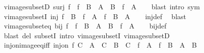 \begin{isabellebody}
{\isafoldproof}%
%
\isadelimproof
\isanewline
%
\endisadelimproof
\isanewline
{}\isamarkupfalse%
\ vimage{\isacharunderscore}{\kern0pt}subsetD{\isacharcolon}{\kern0pt}\ {\isachardoublequoteopen}surj\ f\ {\isasymLongrightarrow}\ f\ {\isacharminus}{\kern0pt}{\isacharbackquote}{\kern0pt}\ B\ {\isasymsubseteq}\ A\ {\isasymLongrightarrow}\ B\ {\isasymsubseteq}\ f\ {\isacharbackquote}{\kern0pt}\ A{\isachardoublequoteclose}\isanewline
%
\isadelimproof
\ \ %
\endisadelimproof
%
\isatagproof
{}\isamarkupfalse%
\ {\isacharparenleft}{\kern0pt}blast\ intro{\isacharcolon}{\kern0pt}\ sym{\isacharparenright}{\kern0pt}%
\endisatagproof
{\isafoldproof}%
%
\isadelimproof
\isanewline
%
\endisadelimproof
\isanewline
{}\isamarkupfalse%
\ vimage{\isacharunderscore}{\kern0pt}subsetI{\isacharcolon}{\kern0pt}\ {\isachardoublequoteopen}inj\ f\ {\isasymLongrightarrow}\ B\ {\isasymsubseteq}\ f\ {\isacharbackquote}{\kern0pt}\ A\ {\isasymLongrightarrow}\ f\ {\isacharminus}{\kern0pt}{\isacharbackquote}{\kern0pt}\ B\ {\isasymsubseteq}\ A{\isachardoublequoteclose}\isanewline
%
\isadelimproof
\ \ %
\endisadelimproof
%
\isatagproof
{}\isamarkupfalse%
\ inj{\isacharunderscore}{\kern0pt}def\ \isamarkupfalse%
\ blast%
\endisatagproof
{\isafoldproof}%
%
\isadelimproof
\isanewline
%
\endisadelimproof
\isanewline
{}\isamarkupfalse%
\ vimage{\isacharunderscore}{\kern0pt}subset{\isacharunderscore}{\kern0pt}eq{\isacharcolon}{\kern0pt}\ {\isachardoublequoteopen}bij\ f\ {\isasymLongrightarrow}\ f\ {\isacharminus}{\kern0pt}{\isacharbackquote}{\kern0pt}\ B\ {\isasymsubseteq}\ A\ {\isasymlongleftrightarrow}\ B\ {\isasymsubseteq}\ f\ {\isacharbackquote}{\kern0pt}\ A{\isachardoublequoteclose}\isanewline
%
\isadelimproof
\ \ %
\endisadelimproof
%
\isatagproof
{}\isamarkupfalse%
\ bij{\isacharunderscore}{\kern0pt}def\ \isamarkupfalse%
\ {\isacharparenleft}{\kern0pt}blast\ del{\isacharcolon}{\kern0pt}\ subsetI\ intro{\isacharcolon}{\kern0pt}\ vimage{\isacharunderscore}{\kern0pt}subsetI\ vimage{\isacharunderscore}{\kern0pt}subsetD{\isacharparenright}{\kern0pt}%
\endisatagproof
{\isafoldproof}%
%
\isadelimproof
\isanewline
%
\endisadelimproof
\isanewline
{}\isamarkupfalse%
\ inj{\isacharunderscore}{\kern0pt}on{\isacharunderscore}{\kern0pt}image{\isacharunderscore}{\kern0pt}eq{\isacharunderscore}{\kern0pt}iff{\isacharcolon}{\kern0pt}\ {\isachardoublequoteopen}inj{\isacharunderscore}{\kern0pt}on\ f\ C\ {\isasymLongrightarrow}\ A\ {\isasymsubseteq}\ C\ {\isasymLongrightarrow}\ B\ {\isasymsubseteq}\ C\ {\isasymLongrightarrow}\ f\ {\isacharbackquote}{\kern0pt}\ A\ {\isacharequal}{\kern0pt}\ f\ {\isacharbackquote}{\kern0pt}\ B\ {\isasymlongleftrightarrow}\ A\ {\isacharequal}{\kern0pt}\ B{\isachardoublequoteclose}\isanewline

\end{isabellebody}
